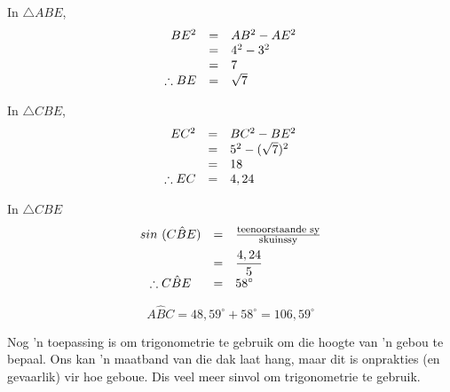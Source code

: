 \begin{wex}
{
In $\triangle ABE$, \\
\begin{equation*}
\begin{array}{ccl}
 \hfill BE^{2} &=& AB^{2} - AE^{2} \hfill \\
\hfill &=& 4^{2} - 3^{2} \hfill \\
\hfill &=&7\\
\therefore BE &=& \sqrt{7}
\end{array}
\end{equation*}

In $\triangle CBE$, \\

\begin{equation*}
\begin{array}{ccl}
 \hfill EC^{2} &=& BC^{2} - BE^{2} \hfill \\
\hfill &=& 5^{2} - (\sqrt{7})^{2} \hfill \\
\hfill &=& 18 \hfill \\
\therefore EC &=& 4,24 \hfill
\end{array}
\end{equation*}

In $\triangle CBE$ 
\begin{equation*}
\begin{array}{ccl}\hfill sin~(C\hat{B}E)& =& \frac{\mbox{\footnotesize teenoorstaande sy}}{\mbox{\footnotesize skuinssy}}\hfill \vspace{5pt}\\
 \hfill & =& \dfrac{4,24}{5}\hfill \\
 \therefore C\hat{B}E& =& {58}^{\circ }\hfill 
\end{array}
\end{equation*}

\begin{equation*}
A\hat{B}C = 48,59^{\circ} + 58^{\circ} = 106,59^{\circ}
\end{equation*}
}
\end{wex}



Nog 'n toepassing is om trigonometrie te gebruik om die hoogte van 'n gebou te bepaal. Ons kan 'n maatband van die dak laat hang, maar dit is onprakties (en gevaarlik) vir hoe geboue. Dis veel meer sinvol om trigonometrie te gebruik.\par 

